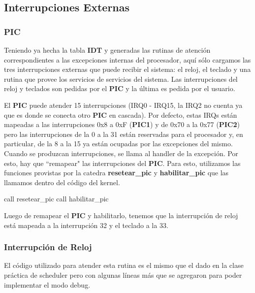 \subsection{Interrupciones Externas}

\subsubsection{PIC}

Teniendo ya hecha la tabla \textbf{IDT} y generadas las rutinas de atención correspondientes a las excepciones internas del procesador, aquí sólo cargamos las tres interrupciones externas que puede recibir el sistema: el reloj, el teclado y una rutina que provee los servicios de servicios del sistema. Las interrupciones del reloj y teclados son pedidas por el \textbf{PIC} y la última es pedida por el usuario.

El \textbf{PIC} puede atender 15 interrupciones (IRQ0 - IRQ15, la IRQ2 no cuenta ya que es donde se conecta otro \textbf{PIC} en cascada). Por defecto, estas IRQs están mapeadas a las interrupciones 0x8 a 0xF (\textbf{PIC1}) y de 0x70 a la 0x77 (\textbf{PIC2}) pero las interrupciones de la 0 a la 31 están reservadas para el procesador y, en particular, de la 8 a la 15 ya están ocupadas por las excepciones del mismo. Cuando se produzcan interrupciones, se llama al handler de la excepción. Por esto, hay que ``remapear" { } las interrupciones del \textbf{PIC}. Para esto, utilizamos las funciones provistas por la catedra \textbf{resetear_pic} y \textbf{habilitar_pic} que las llamamos dentro del código del kernel.

\begin{algorithm}[]
		\begin{algorithmic}[H]
			\State call resetear_pic
    		\State call habilitar_pic
		\end{algorithmic}
\end{algorithm}

Luego de remapear el \textbf{PIC} y habilitarlo, tenemos que la interrupción de reloj está mapeada a la interrupción 32 y el teclado a la 33.

\subsubsection{Interrupción de Reloj}

El código utilizado para atender esta rutina es el mismo que el dado en la clase práctica de scheduler pero con algunas líneas más que se agregaron para poder implementar el modo debug.

